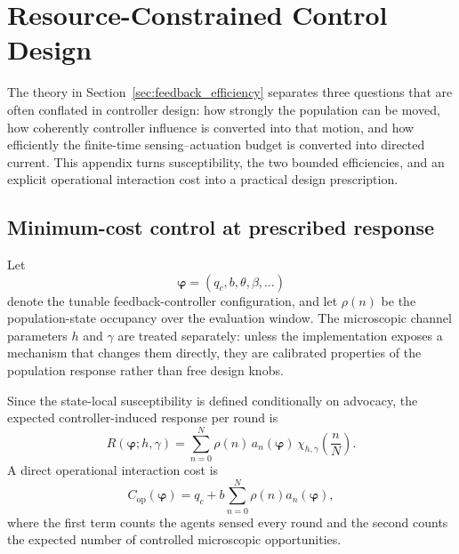 \section{Resource-Constrained Control Design}
\label{app:resource_constrained_control}

The theory in Section~\ref{sec:feedback_efficiency} separates three questions that are often conflated in controller design: how strongly the population can be moved, how coherently controller influence is converted into that motion, and how efficiently the finite-time sensing--actuation budget is converted into directed current. This appendix turns susceptibility, the two bounded efficiencies, and an explicit operational interaction cost into a practical design prescription.

\subsection{Minimum-cost control at prescribed response}
\label{app:min_cost_control}

Let
\[
\boldsymbol{\varphi}=(q_c,b,\theta,\beta,\ldots)
\]
denote the tunable feedback-controller configuration, and let \(\rho(n)\) be the population-state occupancy over the evaluation window. The microscopic channel parameters \(h\) and \(\gamma\) are treated separately: unless the implementation exposes a mechanism that changes them directly, they are calibrated properties of the population response rather than free design knobs.

Since the state-local susceptibility is defined conditionally on advocacy, the expected controller-induced response per round is
\begin{equation}
R(\boldsymbol{\varphi};h,\gamma)
=
\sum_{n=0}^{N}
\rho(n)\,
a_n(\boldsymbol{\varphi})\,
\chi_{h,\gamma}\!\left(\frac{n}{N}\right).
\label{eq:app_expected_response}
\end{equation}
A direct operational interaction cost is
\begin{equation}
C_{\mathrm{op}}(\boldsymbol{\varphi})
=
q_c
+
b\sum_{n=0}^{N}\rho(n)a_n(\boldsymbol{\varphi}),
\label{eq:app_operational_cost}
\end{equation}
where the first term counts the agents sensed every round and the second counts the expected number of controlled microscopic opportunities.

